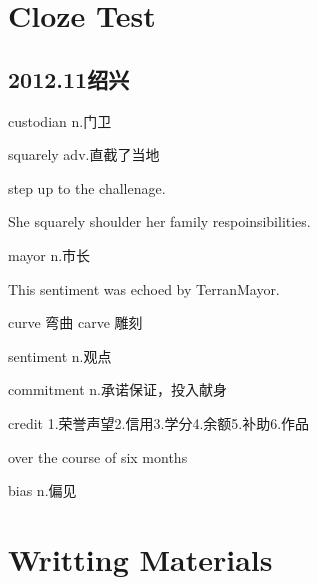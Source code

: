 \documentclass[utf8]{ctexart}
\begin{document}
	\section{Cloze Test}
	\subsection{2012.11绍兴}
	\par custodian n.门卫
	\par squarely adv.直截了当地	
	\par step up to the challenage.	
	\par She squarely shoulder her family respoinsibilities.	
	\par mayor n.市长
	\par This sentiment was echoed by TerranMayor.
	\par curve 弯曲 carve 雕刻
	\par sentiment n.观点
	\par commitment n.承诺保证，投入献身
	\par credit 1.荣誉声望2.信用3.学分4.余额5.补助6.作品
	\par over the course of six months
	\par bias n.偏见	
	
	\section{Writting Materials}
\end{document}
